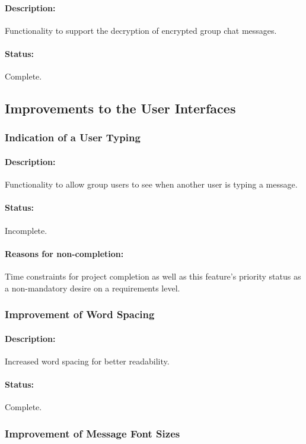 \documentclass[11pt]{article}
\begin{document}
\paragraph{Description:} Functionality to support the decryption of encrypted group chat messages.
\paragraph{Status:} Complete.

\subsection{Improvements to the User Interfaces}

\subsubsection{Indication of a User Typing}
\paragraph{Description:} Functionality to allow group users to see when another user is typing a message.
\paragraph{Status:} Incomplete.
\paragraph{Reasons for non-completion:} Time constraints for project completion as well as this feature's priority status as a non-mandatory desire on a requirements level.

\subsubsection{Improvement of Word Spacing}
\paragraph{Description:} Increased word spacing for better readability.
\paragraph{Status:} Complete.

\subsubsection{Improvement of Message Font Sizes}
\end{document}
